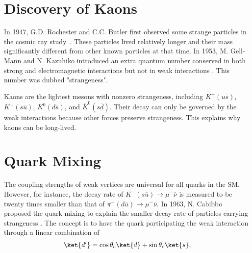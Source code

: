 
% 

\section{Discovery of Kaons}
\label{sec:kaon}


In 1947, G.D. Rochester and C.C. Butler first observed some strange particles in the cosmic ray study~\parencite{strange_exp}. These particles lived relatively longer and their mass significantly different from other known particles at that time. In 1953, M. Gell-Mann and N. Kazuhiko introduced an extra quantum number conserved in both strong and electromagnetic interactions but not in weak interactions \parencite{gell_mann_strangeness, nishijima_strangeness}. This number was dubbed "strangeness". 

Kaons are the lightest mesons with nonzero strangeness, including ${K^+(u \overline{s})}$, ${K^-(s\overline{u})}$, ${K^0(d \overline{s})}$, and ${\overline{K}^0(s \overline{d})}$. Their decay can only be governed by the weak interactions because other forces preserve strangeness. This explains why kaons can be long-lived.


%
%

\section{Quark Mixing}
\label{sec:quark_mixing}
%
%


The coupling strengths of weak vertices are universal for all quarks in the SM. However, for instance, the decay rate of ${K^-(s\overline{u})\to\mu^-\overline{\nu}}$ is measured to be twenty times smaller than that of ${\pi^-(d\overline{u})\to\mu^-\overline{\nu}}$. In 1963, N. Cabibbo proposed the quark mixing to explain the smaller decay rate of particles carrying strangeness  \parencite{Cabibbo}. The concept is to have the quark participating the weak interaction through a linear combination of
\vspace{1em}
\begin{align}
\ket{d'} = \cos{\theta_c} \ket{d} +  \sin{\theta_c} \ket{s} ,
\end{align}

